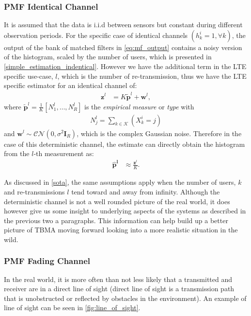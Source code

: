 \documentclass{article}
\begin{document}
\subsubsection{PMF Identical Channel}\label{det_chan}
It is assumed that the data is i.i.d between sensors but constant during different observation periods. For the specific case of identical channels ${(h^i_k = 1, \forall k)}$, the output of the bank of matched filters in \cref{eq:mf_output} contains a noisy version of the histogram, scaled by the number of users, which is presented in \cref{simple_estimation_indentical}. However we have the additional term in the LTE specific use-case, $l$, which is the number of re-transmission, thus we have the LTE specific estimator for an identical channel of:
%
\begin{align}
    \boldsymbol{z}^l &= K \tilde{\boldsymbol{p}}^l + \boldsymbol{w}^l, 
\end{align}
%
where $\tilde{\boldsymbol{p}}^l = \frac{1}{K}[N_1^l, \ldots, N_R^l]$ is the \emph{empirical measure} or \emph{type} with
\begin{align}
    N_j^l = \sum_{k \in \mathcal{K}}(X^i_k = j)
\end{align}
and $\boldsymbol{w}^l \sim \mathcal{CN}(0, {\sigma^2 \boldsymbol{I}_R})$, which is the complex Gaussian noise.
%
Therefore in the case of this deterministic channel, the estimate can directly obtain the histogram from the $l$-th measurement as:
%
\begin{align}
    \boldsymbol{\hat{p}^l} &\approx \frac{\boldsymbol{z}^l}{K}. \label{eq:empf_h_const}
\end{align}

As discussed in \cref{sota}, the same assumptions apply when the number of users, $k$ and re-transmissions $l$ tend toward and away from infinity.
Although the deterministic channel is not a well rounded picture of the real world, it does however give us some insight to underlying aspects of the systems as described in the previous two a paragraphs. This information can help build up a better picture of TBMA moving forward looking into a more realistic situation in the wild.

\subsubsection{PMF Fading Channel}\label{rand_chan}
In the real world, it is more often than not less likely that a transmitted and receiver are in a direct line of sight (direct line of sight is a transmission path that is unobstructed or reflected by obstacles in the environment). An example of line of sight can be seen in \cref{fig:line_of_sight}.
\end{document}
